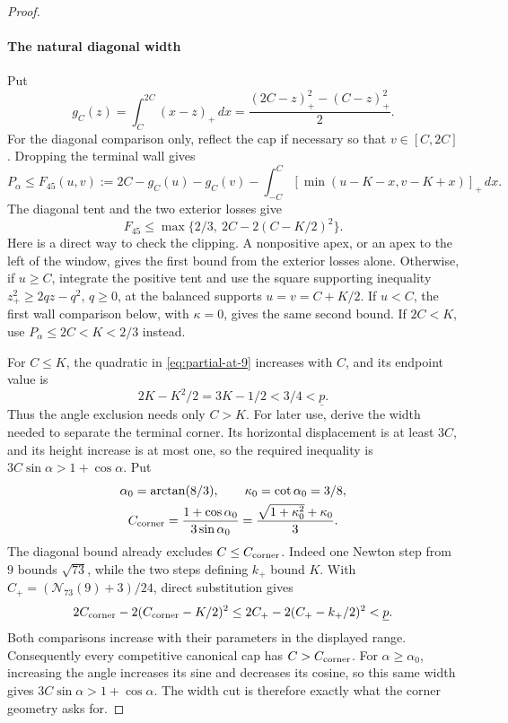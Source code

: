 \begin{proof}
\paragraph{The natural diagonal width}

Put
\[
g_C(z)=\int_C^{2C}(x-z)_+\,dx
=\frac{(2C-z)_+^2-(C-z)_+^2}{2}.
\]
For the diagonal comparison only, reflect the cap if necessary so that
\(v\in[C,2C]\). Dropping the terminal wall gives
\begin{equation}\label{eq:partial-at-7}
P_\alpha\le F_{45}(u,v):=2C-g_C(u)-g_C(v)
-\int_{-C}^C[\min(u-K-x,v-K+x)]_+\,dx.
\end{equation}
The diagonal tent and the two exterior losses give
\begin{equation}\label{eq:partial-at-9}
F_{45}\le\max\{2/3,\ 2C-2(C-K/2)^2\}.
\end{equation}
Here is a direct way to check the clipping. A nonpositive apex, or an
apex to the left of the window, gives the first bound from the exterior
losses alone. Otherwise, if \(u\ge C\), integrate the positive tent
and use the square supporting inequality
\(z_+^2\ge2qz-q^2\), \(q\ge0\), at the balanced supports
\(u=v=C+K/2\). If \(u<C\), the first wall comparison below, with
\(\kappa=0\), gives the same second bound. If \(2C<K\), use
\(P_\alpha\le2C<K<2/3\) instead.

For \(C\le K\), the quadratic in \eqref{eq:partial-at-9} increases
with \(C\), and its endpoint value is
\[
2K-K^2/2=3K-1/2<3/4<\underline p.
\]
Thus the angle exclusion needs only \(C>K\).
For later use, derive the width needed to separate the terminal corner.
Its horizontal displacement is at least \(3C\), and its height
increase is at most one, so the required inequality is
\(3C\sin\alpha>1+\cos\alpha\). Put
\begin{equation}\label{eq:partial-at-10}
\begin{gathered}
\alpha_0=\arctan(8/3),\qquad\kappa_0=\cot\alpha_0=3/8,\\
C_{\rm corner}=\frac{1+\cos\alpha_0}{3\sin\alpha_0}
=\frac{\sqrt{1+\kappa_0^2}+\kappa_0}{3}.
\end{gathered}
\end{equation}
The diagonal bound already excludes \(C\le C_{\rm corner}\).
Indeed one Newton step from \(9\) bounds \(\sqrt{73}\), while the
two steps defining \(k_+\) bound \(K\). With
\(C_+=(\mathcal N_{73}(9)+3)/24\), direct substitution gives
\[
2C_{\rm corner}-2(C_{\rm corner}-K/2)^2
\le2C_+-2(C_+-k_+/2)^2<\underline p.
\]
Both comparisons increase with their parameters in the displayed range.
Consequently every competitive canonical cap has
\(C>C_{\rm corner}\). For \(\alpha\ge\alpha_0\), increasing the angle
increases its sine and decreases its cosine, so this same width gives
\(3C\sin\alpha>1+\cos\alpha\). The width cut is therefore exactly
what the corner geometry asks for.


\end{proof}
